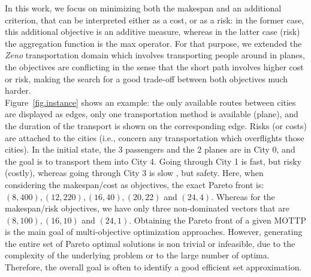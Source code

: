 \documentclass{llncs}
\begin{document}
\indent In this work, we focus on minimizing both the makespan and an additional criterion, that can be interpreted either as a cost, or as a risk: in the former case, this additional objective is an additive measure,
whereas in the latter case (risk) the aggregation function is the max operator. 
For that purpose, we extended  the \textit{Zeno}  transportation domain  which involves transporting people around in planes, the  objectives  are conflicting in the sense that the short path involves higher cost or risk, making the search for a good  trade-off  between both objectives  much harder.\\
\indent Figure~\ref{fig.instance} shows an example:  the only available routes between cities are displayed as edges, only one transportation method is available (plane), and the duration of the transport is shown on the corresponding edge. Risks (or costs) are attached to the cities (i.e., concern any transportation which overflights those cities). In the initial state, the 3 passengers and the 2 planes are in City 0, and the goal is to transport them into City 4.
Going through City 1 is fast, but risky (costly), whereas going through City 3 is slow , but safety.
Here, when considering the makespan/cost as objectives, the exact Pareto front is: $(8, 400), (12, 220), (16, 40), (20, 22)$ and $(24, 4)$. 
Whereas for the makespan/risk objectives, we have only three non-dominated vectors that are $(8, 100), (16, 10)$ and $(24, 1)$.
 Obtaining the Pareto front of a given MOTTP  is the main goal of multi-objective optimization approaches. 
However, generating the entire set of Pareto optimal solutions is non trivial or infeasible, due to the complexity of
the underlying problem or to the large number of optima. Therefore, the overall goal is often to identify a good efficient set approximation.
\end{document}
